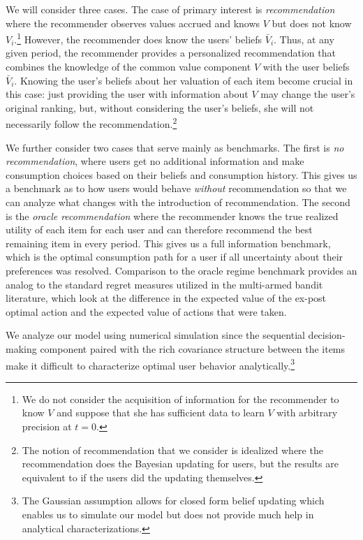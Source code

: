\documentclass[manuscript]{acmart}
\newcommand{\xhdr}[1]{\vspace{1mm} \noindent{\bf #1}}
\begin{document}
We will consider three cases. The case of primary interest is \textit{recommendation} where the recommender observes values accrued and knows $V$ but does not know $V_i$.\footnote{We do not consider the acquisition of information for the recommender to know $V$ and suppose that she has sufficient data to learn $V$ with arbitrary precision at $t = 0$.} However, the recommender does know the users' beliefs $\bar V_i$. Thus, at any given period, the recommender provides a personalized recommendation that combines the knowledge of the common value component $V$ with the user beliefs $\bar V_i$. Knowing the user's beliefs about her valuation of each item become crucial in this case: just providing the user with information about $V$ may change the user's original ranking, but, without considering the user's beliefs, she will not necessarily follow the recommendation.\footnote{The notion of recommendation that we consider is idealized where the recommendation does the Bayesian updating for users, but the results are equivalent to if the users did the updating themselves.}
\par

We further consider two cases that serve mainly as benchmarks. The first is \textit{no recommendation}, where users get no additional information and make consumption choices based on their beliefs and consumption history. This gives us a benchmark as to how users would behave \textit{without} recommendation so that we can analyze what changes with the introduction of recommendation. The second is the \textit{oracle recommendation} where the recommender knows the true realized utility of each item for each user and can therefore recommend the best remaining item in every period. This gives us a full information benchmark, which is the optimal consumption path for a user if all uncertainty about their preferences was resolved. Comparison to the oracle regime benchmark provides an analog to the standard regret measures utilized in the multi-armed bandit literature, which look at the difference in the expected value of the ex-post optimal action and the expected value of actions that were taken.
\par

\xhdr{Simulation Details.}
We analyze our model using numerical simulation since the sequential decision-making component paired with the rich covariance structure between the items make it difficult to characterize optimal user behavior analytically.\footnote{The Gaussian assumption allows for closed form belief updating which enables us to simulate our model but does not provide much help in analytical characterizations.}
\par
\end{document}
